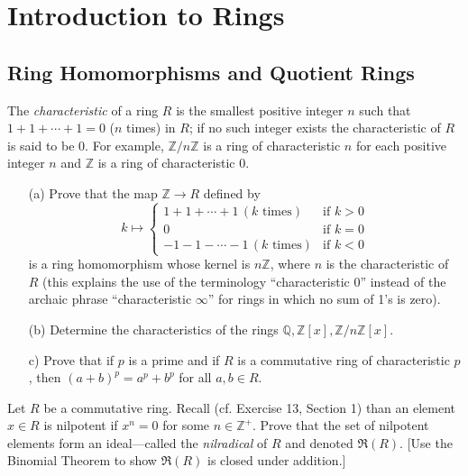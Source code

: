 \documentclass[10pt]{article}
\newcommand{\Q}{\mathbb{Q}}
\newcommand{\Z}{\mathbb{Z}}
\begin{document}
\setcounter{section}{6}
\section{Introduction to Rings}

\setcounter{subsection}{2}
\subsection{Ring Homomorphisms and Quotient Rings}

\begin{problem}[title=Problem 26]
    \par The \emph{characteristic} of a ring \(R\) is the smallest positive integer \(n\) such that \(1+1+\cdots+1=0\) (\(n\) times) in \(R\); if no such integer exists the characteristic of \(R\) is said to be \(0\). For example, \(\Z/n\Z\) is a ring of characteristic \(n\) for each positive integer \(n\) and \(\Z\) is a ring of characteristic \(0\).
    \begin{itemize}
        \item[(a)] Prove that the map \(\Z\to R\) defined by
        \[k\mapsto\begin{cases}1+1+\cdots+1\,(k \text{ times})&\text{if }k>0\\0&\text{if }k=0\\-1-1-\cdots-1\,(k\text{ times})&\text{if }k<0\end{cases}\]
        is a ring homomorphism whose kernel is \(n\Z\), where \(n\) is the characteristic of \(R\) (this explains the use of the terminology ``characteristic 0'' instead of the archaic phrase ``characteristic \(\infty\)'' for rings in which no sum of 1's is zero).
        \item[(b)] Determine the characteristics of the rings \(\Q,\Z[x],\Z/n\Z[x]\).
        \item[c)] Prove that if \(p\) is a prime and if \(R\) is a commutative ring of characteristic \(p\), then \((a+b)^p=a^p+b^p\) for all \(a,b\in R\).
    \end{itemize}
\end{problem}

\begin{problem}[title=Problem 29]
    \par Let \(R\) be a commutative ring. Recall (cf. Exercise 13, Section 1) than an element \(x\in R\) is nilpotent if \(x^n=0\) for some \(n\in\Z^+\). Prove that the set of nilpotent elements form an ideal---called the \emph{nilradical} of \(R\) and denoted \(\mathfrak{R}(R)\). [Use the Binomial Theorem to show \(\mathfrak{R}(R)\) is closed under addition.]
\end{problem}
\end{document}
